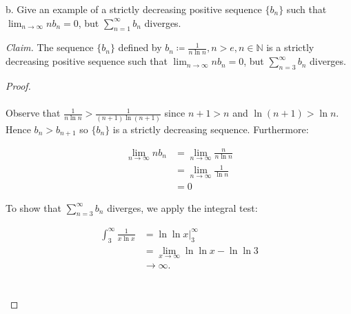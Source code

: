 b.  Give an example of a strictly decreasing positive sequence $\{b_n\}$ such
    that $\lim_{n \rightarrow \infty}{nb_n} = 0$, but
    $\sum\limits_{n=1}^{\infty}{b_n}$ diverges.

    \emph{Claim.} The sequence $\{b_n\}$ defined by 
    $b_n \coloneqq \frac{1}{n\ln{n}}, n > e, n \in \mathbb{N}$ is a strictly
    decreasing positive sequence such that 
    $\lim_{n \rightarrow \infty}{nb_n} = 0$, but
    $\sum\limits_{n=3}^{\infty}{b_n}$ diverges.

    \begin{proof}\ \\\\
        Observe that $\frac{1}{n\ln{n}} > \frac{1}{(n+1)\ln{(n+1)}}$ since 
        $n + 1 > n$ and $\ln{(n+1)} > \ln{n}$. Hence $b_{n} > b_{n+1}$ so
        $\{b_n\}$ is a strictly decreasing sequence. Furthermore:

        \begin{align*}
            \lim_{n \rightarrow \infty}{nb_n} &= \lim_{n \rightarrow \infty}{\frac{n}{n\ln{n}}} \\
                                              &= \lim_{n \rightarrow \infty}{\frac{1}{\ln{n}}} \\
                                              &= 0
        \end{align*}

        To show that $\sum\limits_{n=3}^{\infty}{b_n}$ diverges, we apply the
        integral test:

        \begin{align*}
            \int_3^\infty{\frac{1}{x\ln{x}}} &= \ln{\ln{x}}\rvert_3^\infty  \\
                                             &= \lim_{x \rightarrow \infty}{\ln{\ln{x}}} - \ln{\ln{3}} \\
                                             &\rightarrow \infty.
        \end{align*}
        \\\\
    \end{proof}